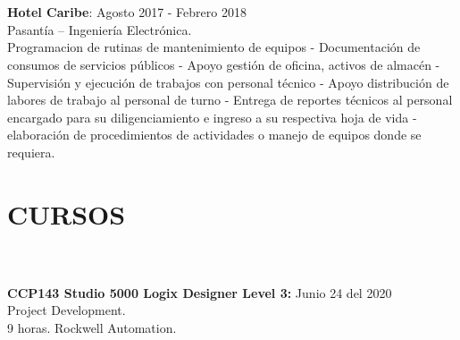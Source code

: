 \documentclass[margin]{res}
\begin{document}
\begin{resume}
\section{\centering}
\hfill \break
\textbf{Hotel Caribe}: \hfill Agosto 2017 - Febrero 2018
\\Pasantía – Ingeniería Electrónica.
\\Programacion de rutinas de mantenimiento de equipos - Documentación de consumos de servicios públicos - Apoyo gestión de oficina, activos de almacén - Supervisión y ejecución de trabajos con personal técnico - Apoyo distribución de labores de trabajo al personal de turno - Entrega de reportes técnicos al personal encargado para su diligenciamiento e ingreso a su respectiva hoja de vida - elaboración de procedimientos de actividades o manejo de equipos donde se requiera. 


\section{CURSOS}

\section{\centering}
\hfill
\\\textbf{CCP143 Studio 5000 Logix Designer Level 3:} \hfill Junio 24 del 2020
\\Project Development.
\\ 9 horas. Rockwell Automation.


\end{resume}
\end{document}
